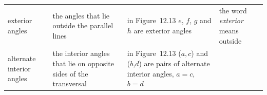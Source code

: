 \begin{center}
\begin{xtabular*}{\mytablewidth}[t]{|p{3cm}|p{3cm}|p{3cm}|p{20\mystarwidth}|}
     \tabularnewline{}
        exterior angles &
        the angles that lie outside the parallel lines &
        in Figure~12.13 \begin{math}e\end{math}, \begin{math}f\end{math}, \begin{math}g\end{math} and \begin{math}h\end{math} are exterior angles &
        the word \textsl{exterior} means outside%
     \tabularnewline{}
        alternate interior angles &
        the interior angles that lie on opposite sides of the transversal &
        in Figure~12.13 (\begin{math}a,c\end{math}) and (\begin{math}b\end{math},\begin{math}d\end{math}) are pairs of alternate interior angles, \begin{math}a=c\end{math}, \begin{math}b=d\end{math} &

\end{xtabular*}
\end{center}
